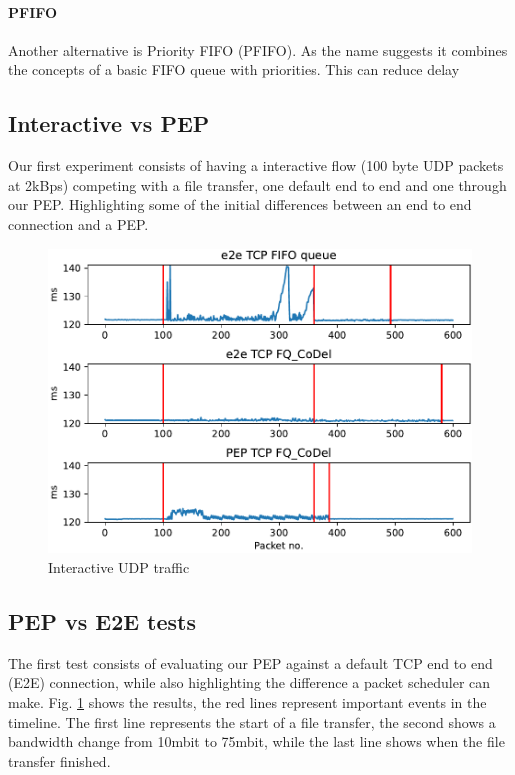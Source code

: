 \documentclass[a4paper,english, 11pt]{report}
\begin{document}
\paragraph{PFIFO}
Another alternative is Priority FIFO (PFIFO). As the name suggests it combines the concepts of a basic FIFO queue with priorities. This can reduce delay



\subsection{Interactive vs PEP}
Our first experiment consists of having a interactive flow (100 byte UDP packets at 2kBps) competing with a file transfer, one default end to end and one through our PEP. Highlighting some of the initial differences between an end to end connection and a PEP.\\


\begin{figure}[h] %
	\centering
	\includegraphics[scale=0.50]{../diagrams/graphs/initial_udp_latency_timeseries.pdf}
  	\caption{Interactive UDP traffic}
  	\label{fig:inital_test}
\end{figure}

\subsection{PEP vs E2E tests}
The first test consists of evaluating our PEP against a default TCP end to end (E2E) connection, while also highlighting the difference a packet scheduler can make. Fig. \ref{fig:inital_test} shows the results, the red lines represent important events in the timeline.
The first line represents the start of a file transfer, the second shows a bandwidth change from 10mbit to 75mbit, while the last line shows when the file transfer finished.\\ 
\end{document}
